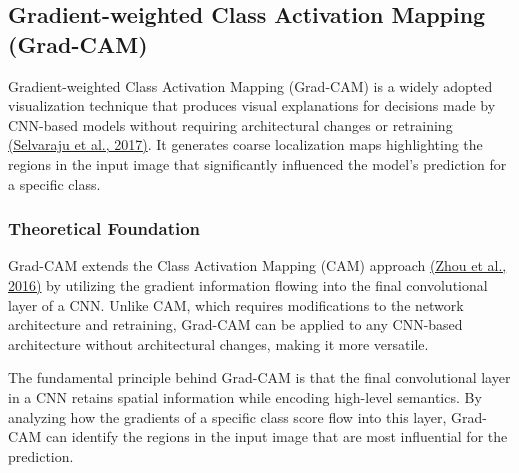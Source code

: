 \documentclass[a4paper,12pt]{report}
\begin{document}
\subsection{Gradient-weighted Class Activation Mapping (Grad-CAM)}

Gradient-weighted Class Activation Mapping (Grad-CAM) is a widely adopted visualization technique that produces visual explanations for decisions made by CNN-based models without requiring architectural changes or retraining \href{https://arxiv.org/abs/1610.02391}{(Selvaraju et al., 2017)}. It generates coarse localization maps highlighting the regions in the input image that significantly influenced the model's prediction for a specific class.

\subsubsection{Theoretical Foundation}

Grad-CAM extends the Class Activation Mapping (CAM) approach \href{https://arxiv.org/abs/1512.04150}{(Zhou et al., 2016)} by utilizing the gradient information flowing into the final convolutional layer of a CNN. Unlike CAM, which requires modifications to the network architecture and retraining, Grad-CAM can be applied to any CNN-based architecture without architectural changes, making it more versatile.

The fundamental principle behind Grad-CAM is that the final convolutional layer in a CNN retains spatial information while encoding high-level semantics. By analyzing how the gradients of a specific class score flow into this layer, Grad-CAM can identify the regions in the input image that are most influential for the prediction.

\end{document}
